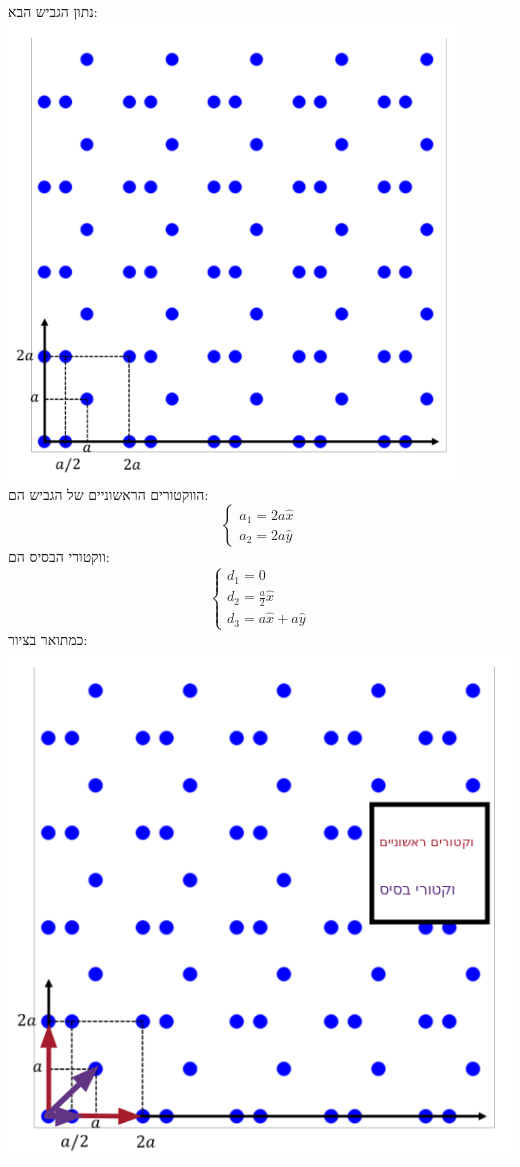 \documentclass{article}
\begin{document}
\begin{Question}
נתון הגביש הבא:\\
\includegraphics[width=0.9\textwidth]{image/Q71.png}\\
הווקטורים הראשוניים של הגביש הם:
$$\begin{cases}
    a_{1}=2a\hat{x}\\
    a_{2}=2a\hat{y}
\end{cases}
$$
ווקטורי הבסיס הם:
$$\begin{cases}
    d_{1}=0\\
    d_{2}=\frac{a}{2}\hat{x}\\
    d_{3}=a\hat{x}+a\hat{y}
\end{cases}
$$ כמתואר בציור:\\
\includegraphics[]{image/Q72.png}\\

\end{Question}
\end{document}
